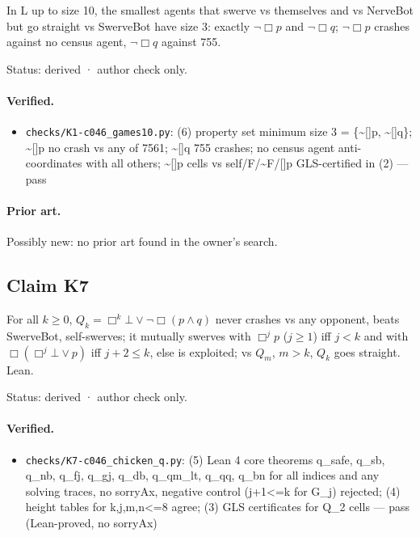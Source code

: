 \documentclass{article}
\begin{document}
In L up to size 10, the smallest agents that swerve vs themselves and vs NerveBot but go straight vs SwerveBot have size 3: exactly $\neg\Box p$ and $\neg\Box q$; $\neg\Box p$ crashes against no census agent, $\neg\Box q$ against 755.

Status: derived · author check only.

\paragraph{Verified.}
\begin{itemize}
\item \texttt{checks/K1-c046\_games10.py}: (6) property set minimum size 3 = \{\textasciitilde{}[]p, \textasciitilde{}[]q\}; \textasciitilde{}[]p no crash vs any of 7561; \textasciitilde{}[]q 755 crashes; no census agent anti-coordinates with all others; \textasciitilde{}[]p cells vs self/F/\textasciitilde{}F/[]p GLS-certified in (2) --- pass
\end{itemize}

\paragraph{Prior art.} Possibly new: no prior art found in the owner's search.

\subsection*{Claim K7}

For all $k\ge0$, $Q_k=\Box^k\bot\vee\neg\Box(p\wedge q)$ never crashes vs any opponent, beats SwerveBot, self-swerves; it mutually swerves with $\Box^jp$ ($j\ge1$) iff $j<k$ and with $\Box(\Box^j\bot\vee p)$ iff $j+2\le k$, else is exploited; vs $Q_m$, $m>k$, $Q_k$ goes straight. Lean.

Status: derived · author check only.

\paragraph{Verified.}
\begin{itemize}
\item \texttt{checks/K7-c046\_chicken\_q.py}: (5) Lean 4 core theorems q\_safe, q\_sb, q\_nb, q\_fj, q\_gj, q\_db, q\_qm\_lt, q\_qq, q\_bn for all indices and any solving traces, no sorryAx, negative control (j+1\textless{}=k for G\_j) rejected; (4) height tables for k,j,m,n\textless{}=8 agree; (3) GLS certificates for Q\_2 cells --- pass (Lean-proved, no sorryAx)
\end{itemize}
\end{document}
